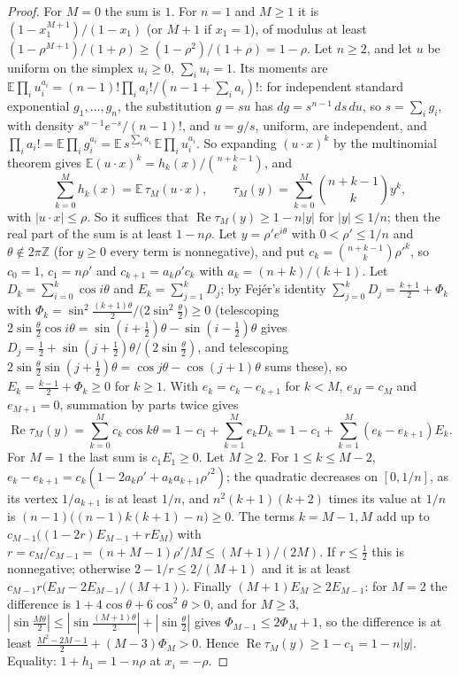 \documentclass[11pt]{article}
\begin{document}
\begin{proof}
For $M=0$ the sum is $1$.  For $n=1$ and $M\ge1$ it is
$(1-x_1^{M+1})/(1-x_1)$ (or $M+1$ if $x_1=1$), of modulus at least
$(1-\rho^{M+1})/(1+\rho)\ge(1-\rho^2)/(1+\rho)=1-\rho$.  Let $n\ge2$, and let
$u$ be uniform on the simplex $u_i\ge0$, $\sum_iu_i=1$.  Its moments are
$\mathbb E\prod_iu_i^{a_i}=(n-1)!\prod_ia_i!/(n-1+\sum_ia_i)!$: for independent
standard exponential $g_1,\ldots,g_n$, the substitution $g=su$ has
$dg=s^{n-1}\,ds\,du$, so $s=\sum_ig_i$, with density $s^{n-1}e^{-s}/(n-1)!$,
and $u=g/s$, uniform, are independent, and
$\prod_ia_i!=\mathbb E\prod_ig_i^{a_i}=\mathbb E\,s^{\sum_ia_i}\,\mathbb E\prod_iu_i^{a_i}$.  So expanding
$(u\cdot x)^k$ by the multinomial theorem gives
$\mathbb E(u\cdot x)^k=h_k(x)/\binom{n+k-1}k$, and
\[
  \sum_{k=0}^Mh_k(x)=\mathbb E\,\tau_M(u\cdot x),\qquad
  \tau_M(y)=\sum_{k=0}^M\binom{n+k-1}ky^k ,
\]
with $|u\cdot x|\le\rho$.  So it suffices that $\operatorname{Re}\tau_M(y)\ge1-n|y|$
for $|y|\le1/n$; then the real part of the sum is at least $1-n\rho$.  Let
$y=\rho'e^{i\theta}$ with $0<\rho'\le1/n$ and $\theta\notin2\pi\mathbb Z$
(for $y\ge0$ every term is nonnegative), and put
$c_k=\binom{n+k-1}k\rho'^k$, so $c_0=1$, $c_1=n\rho'$ and
$c_{k+1}=a_k\rho'c_k$ with $a_k=(n+k)/(k+1)$.  Let
$D_k=\sum_{i=0}^k\cos i\theta$ and $E_k=\sum_{j=1}^kD_j$; by Fej\'er's
identity $\sum_{j=0}^kD_j=\frac{k+1}2+\Phi_k$ with
$\Phi_k=\sin^2\frac{(k+1)\theta}2\big/\bigl(2\sin^2\frac\theta2\bigr)\ge0$
(telescoping $2\sin\frac\theta2\cos i\theta=\sin(i+\frac12)\theta-\sin(i-\frac12)\theta$
gives $D_j=\frac12+\sin(j+\frac12)\theta/(2\sin\frac\theta2)$, and
telescoping $2\sin\frac\theta2\sin(j+\frac12)\theta=\cos j\theta-\cos(j+1)\theta$
sums these), so
$E_k=\frac{k-1}2+\Phi_k\ge0$ for $k\ge1$.  With $e_k=c_k-c_{k+1}$ for $k<M$,
$e_M=c_M$ and $e_{M+1}=0$, summation by parts twice gives
\[
  \operatorname{Re}\tau_M(y)=\sum_{k=0}^Mc_k\cos k\theta
  =1-c_1+\sum_{k=1}^Me_kD_k=1-c_1+\sum_{k=1}^M(e_k-e_{k+1})E_k .
\]
For $M=1$ the last sum is $c_1E_1\ge0$.  Let $M\ge2$.  For $1\le k\le M-2$,
$e_k-e_{k+1}=c_k(1-2a_k\rho'+a_ka_{k+1}\rho'^2)$; the quadratic decreases on
$[0,1/n]$, as its vertex $1/a_{k+1}$ is at least $1/n$, and
$n^2(k+1)(k+2)$ times its value at $1/n$ is $(n-1)\bigl((n-1)k(k+1)-n\bigr)\ge0$.
The terms $k=M-1,M$ add up to $c_{M-1}\bigl((1-2r)E_{M-1}+rE_M\bigr)$ with
$r=c_M/c_{M-1}=(n+M-1)\rho'/M\le(M+1)/(2M)$.  If $r\le\frac12$ this is
nonnegative; otherwise $2-1/r\le2/(M+1)$ and it is at least
$c_{M-1}r\bigl(E_M-2E_{M-1}/(M+1)\bigr)$.  Finally $(M+1)E_M\ge2E_{M-1}$: for
$M=2$ the difference is $1+4\cos\theta+6\cos^2\theta>0$, and for $M\ge3$,
$|\sin\frac{M\theta}2|\le|\sin\frac{(M+1)\theta}2|+|\sin\frac\theta2|$ gives
$\Phi_{M-1}\le2\Phi_M+1$, so the difference is at least
$\frac{M^2-2M-1}2+(M-3)\Phi_M>0$.  Hence $\operatorname{Re}\tau_M(y)\ge1-c_1=1-n|y|$.
Equality: $1+h_1=1-n\rho$ at $x_i=-\rho$.
\end{proof}
\end{document}
